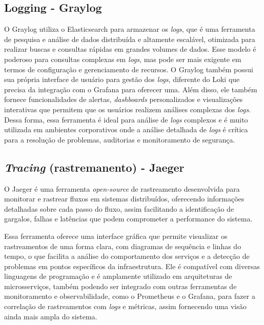 \subsection{Logging - Graylog}
O Graylog utiliza o Elasticsearch para armazenar os \emph{logs}, que é uma ferramenta de pesquisa e análise de dados distribuída e altamente escalável, otimizada para realizar buscas e consultas rápidas em grandes volumes de dados. Esse modelo é poderoso para consultas complexas em \emph{logs}, mas pode ser mais exigente em termos de configuração e gerenciamento de recursos. O Graylog também possui sua própria interface de usuário para gestão dos \emph{logs}, diferente do Loki que precisa da integração com o Grafana para oferecer uma. Além disso, ele também fornece funcionalidades de alertas, \emph{dashboards} personalizados e visualizações interativas que permitem que os usuários realizem análises complexas dos \emph{logs}. Dessa forma, essa ferramenta é ideal para análise de \emph{logs} complexos e é muito utilizada em ambientes corporativos onde a análise detalhada de \emph{logs} é crítica para a resolução de problemas, auditorias e monitoramento de segurança. \cite{graylog}

\subsection{\emph{Tracing} (rastremanento) - Jaeger}
O Jaeger é uma ferramenta \emph{open-source} de rastreamento desenvolvida para monitorar e rastrear fluxos em sistemas distribuídos, oferecendo informações detalhadas sobre cada passo do fluxo, assim facilitando a identificação de gargalos, falhas e latências que podem comprometer a performance do sistema. \cite{jaeger}

Essa ferramenta oferece uma interface gráfica que permite visualizar os rastreamentos de uma forma clara, com diagramas de sequência e linhas do tempo, o que facilita a análise do comportamento dos serviços e a detecção de problemas em pontos específicos da infraestrutura. Ele é compatível com diversas linguagens de programação e é amplamente utilizado em arquiteturas de microsserviços, também podendo ser integrado com outras ferramentas de monitoramento e observabilidade, como o Prometheus e o Grafana, para fazer a correlação de rastreamentos com \emph{logs} e métricas, assim fornecendo uma visão ainda mais ampla do sistema. \cite{jaeger}
  
